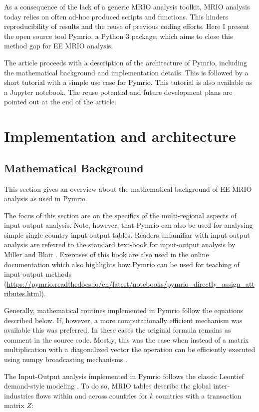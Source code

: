 \documentclass{jors}
\begin{document}
{As a consequence of the lack of a generic MRIO analysis toolkit, MRIO analysis today relies on often ad-hoc produced scripts and functions. This hinders reproducibility of results and the reuse of previous coding efforts.
Here I present the open source tool Pymrio, a Python 3 package, which aims to close this method gap for EE MRIO analysis.

The article proceeds with a description of the architecture of Pymrio, including the mathematical background and implementation details. 
This is followed by a short tutorial with a simple use case for Pymrio. This tutorial is also available as a Jupyter notebook. 
The reuse potential and future development plans are pointed out at the end of the article.


\section*{Implementation and architecture}

\subsection*{Mathematical Background}

This section gives an overview about the mathematical background of EE MRIO analysis as used in Pymrio. 

The focus of this section are on the specifics of the multi-regional aspects of input-output analysis. 
Note, however, that Pymrio can also be used for analysing simple single country input-output tables. 
Readers unfamiliar with input-output analysis are referred to the standard text-book for input-output analysis by Miller and Blair \cite{miller2009_Inputoutput}. Exercises of this book are also used in the online documentation which also highlights how Pymrio can be used for teaching of input-output methods (\url{https://pymrio.readthedocs.io/en/latest/notebooks/pymrio_directly_assign_attributes.html}). 

Generally, mathematical routines implemented in Pymrio follow the equations described below.
If, however, a more computationally efficient mechanism was available this was preferred.
In these cases the original formula remains as comment in the source code.
Mostly,  this was the case when instead of a matrix multiplication with a diagonalized vector the operation can be efficiently executed using numpy broadcasting mechanisms \cite{vanderwalt2011_NumPy}.

The Input-Output analysis implemented in Pymrio follows the classic Leontief demand-style modeling  \cite{leontief1970_Environmental}.
To do so, MRIO tables describe the global inter-industries flows within and across countries for $k$ countries with a transaction matrix $Z$:

}
\end{document}
